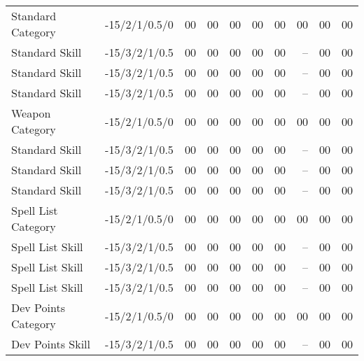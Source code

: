 \begin{center}
\begin{longtable}{llrrrrrrrr}
\endlastfoot
\hline
Standard Category & -15/2/1/0.5/0 & 00 & 00 & 00 & 00 &00 &00 &00&00\\
\hspace{4mm} Standard Skill & -15/3/2/1/0.5 & 00 & 00 & 00 & 00 &00 &-- &00&00\\
\hspace{4mm} Standard Skill & -15/3/2/1/0.5 & 00 & 00 & 00 & 00 &00 &-- &00&00\\
\hspace{4mm} Standard Skill & -15/3/2/1/0.5 & 00 & 00 & 00 & 00 &00 &-- &00&00\\
\hline
\rowcolor{Red}Weapon Category & -15/2/1/0.5/0 & 00 & 00 & 00 & 00 &00 &00 &00&00\\
\rowcolor{Red}\hspace{4mm} Standard Skill & -15/3/2/1/0.5 & 00 & 00 & 00 & 00 &00 &-- &00&00\\
\rowcolor{Red}\hspace{4mm} Standard Skill & -15/3/2/1/0.5 & 00 & 00 & 00 & 00 &00 &-- &00&00\\
\rowcolor{Red}\hspace{4mm} Standard Skill & -15/3/2/1/0.5 & 00 & 00 & 00 & 00 &00 &-- &00&00\\
\hline
\rowcolor{ProcessBlue}Spell List Category & -15/2/1/0.5/0 & 00 & 00 & 00 & 00 &00 &00 &00&00\\
\rowcolor{ProcessBlue}\hspace{4mm} Spell List Skill & -15/3/2/1/0.5 & 00 & 00 & 00 & 00 &00 &-- &00&00\\
\rowcolor{ProcessBlue}\hspace{4mm} Spell List Skill & -15/3/2/1/0.5 & 00 & 00 & 00 & 00 &00 &-- &00&00\\
\rowcolor{ProcessBlue}\hspace{4mm} Spell List Skill & -15/3/2/1/0.5 & 00 & 00 & 00 & 00 &00 &-- &00&00\\
\rowcolor{Green}Dev Points Category & -15/2/1/0.5/0 & 00 & 00 & 00 & 00 &00 &00 &00&00\\
\rowcolor{Green}\hspace{4mm}Dev Points Skill & -15/3/2/1/0.5 & 00 & 00 & 00 & 00 &00 &-- &00&00\\

\end{longtable}
\end{center}